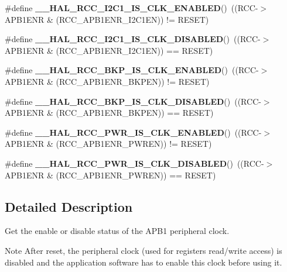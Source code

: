 \begin{DoxyCompactItemize}
\#define {\bfseries \+\_\+\+\_\+\+H\+A\+L\+\_\+\+R\+C\+C\+\_\+\+I2\+C1\+\_\+\+I\+S\+\_\+\+C\+L\+K\+\_\+\+E\+N\+A\+B\+L\+ED}()~((R\+CC-\/$>$A\+P\+B1\+E\+NR \& (R\+C\+C\+\_\+\+A\+P\+B1\+E\+N\+R\+\_\+\+I2\+C1\+EN)) != R\+E\+S\+ET)
\item 
\mbox{\label{group___r_c_c___a_p_b1___peripheral___clock___enable___disable___status_ga8868ab331b4bb14a1d5cc55c9133e4de}} 
\#define {\bfseries \+\_\+\+\_\+\+H\+A\+L\+\_\+\+R\+C\+C\+\_\+\+I2\+C1\+\_\+\+I\+S\+\_\+\+C\+L\+K\+\_\+\+D\+I\+S\+A\+B\+L\+ED}()~((R\+CC-\/$>$A\+P\+B1\+E\+NR \& (R\+C\+C\+\_\+\+A\+P\+B1\+E\+N\+R\+\_\+\+I2\+C1\+EN)) == R\+E\+S\+ET)
\item 
\mbox{\label{group___r_c_c___a_p_b1___peripheral___clock___enable___disable___status_gabec2fa9dccfe0e8e239b02303f2a56c4}} 
\#define {\bfseries \+\_\+\+\_\+\+H\+A\+L\+\_\+\+R\+C\+C\+\_\+\+B\+K\+P\+\_\+\+I\+S\+\_\+\+C\+L\+K\+\_\+\+E\+N\+A\+B\+L\+ED}()~((R\+CC-\/$>$A\+P\+B1\+E\+NR \& (R\+C\+C\+\_\+\+A\+P\+B1\+E\+N\+R\+\_\+\+B\+K\+P\+EN)) != R\+E\+S\+ET)
\item 
\mbox{\label{group___r_c_c___a_p_b1___peripheral___clock___enable___disable___status_gaa6e91221fef5277d99489a232e0d6d6f}} 
\#define {\bfseries \+\_\+\+\_\+\+H\+A\+L\+\_\+\+R\+C\+C\+\_\+\+B\+K\+P\+\_\+\+I\+S\+\_\+\+C\+L\+K\+\_\+\+D\+I\+S\+A\+B\+L\+ED}()~((R\+CC-\/$>$A\+P\+B1\+E\+NR \& (R\+C\+C\+\_\+\+A\+P\+B1\+E\+N\+R\+\_\+\+B\+K\+P\+EN)) == R\+E\+S\+ET)
\item 
\mbox{\label{group___r_c_c___a_p_b1___peripheral___clock___enable___disable___status_ga850f4fd113303ed7322577ad023cf748}} 
\#define {\bfseries \+\_\+\+\_\+\+H\+A\+L\+\_\+\+R\+C\+C\+\_\+\+P\+W\+R\+\_\+\+I\+S\+\_\+\+C\+L\+K\+\_\+\+E\+N\+A\+B\+L\+ED}()~((R\+CC-\/$>$A\+P\+B1\+E\+NR \& (R\+C\+C\+\_\+\+A\+P\+B1\+E\+N\+R\+\_\+\+P\+W\+R\+EN)) != R\+E\+S\+ET)
\item 
\mbox{\label{group___r_c_c___a_p_b1___peripheral___clock___enable___disable___status_ga1019fdeb30eb4bcb23a0bea2278a94a2}} 
\#define {\bfseries \+\_\+\+\_\+\+H\+A\+L\+\_\+\+R\+C\+C\+\_\+\+P\+W\+R\+\_\+\+I\+S\+\_\+\+C\+L\+K\+\_\+\+D\+I\+S\+A\+B\+L\+ED}()~((R\+CC-\/$>$A\+P\+B1\+E\+NR \& (R\+C\+C\+\_\+\+A\+P\+B1\+E\+N\+R\+\_\+\+P\+W\+R\+EN)) == R\+E\+S\+ET)
\end{DoxyCompactItemize}


\subsection{Detailed Description}
Get the enable or disable status of the A\+P\+B1 peripheral clock. 

\begin{DoxyNote}{Note}
After reset, the peripheral clock (used for registers read/write access) is disabled and the application software has to enable this clock before using it. 
\end{DoxyNote}
